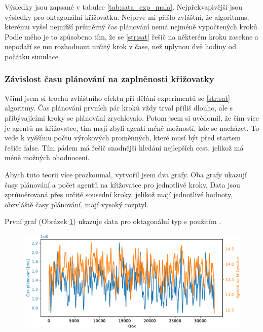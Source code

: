 
Výsledky jsou zapsané v tabulce \ref{tab:sata_exp_mala}.
Nejpřekvapivější jsou výsledky pro oktagonální křižovatku.
Nejprve mi přišlo zvláštní, že algoritmus, kterému vyšel nejnižší průměrný čas plánování nemá nejméně vypočtených kroků.
Podle mého je to způsobeno tím, že se \ref{str:sat} řešič na některém kroku zasekne a nepodaří se mu rozhodnout
určitý krok v čase, než uplynou dvě hodiny od počátku simulace.

\subsubsection{Závislost času plánování na zaplněnosti křižovatky}

Všiml jsem si trochu zvláštního efektu při dělání experimentů se \ref{str:sat} algoritmy.
Čas plánování prvních pár kroků vždy trval příliš dlouho, ale s přibývajícími kroky se plánování zrychlovalo.
Potom jsem si uvědomil, že čím více je agentů na křižovatce, tím mají zbylí agenti méně možností, kde se nacházet.
To vede k vyššímu počtu výrokových proměnných, které musí být před startem řešiče \textrm{false}.
Tím pádem má řešič snadnější hledání nejlepších cest, jelikož má méně možných ohodnocení.

Abych tuto teorii více prozkoumal, vytvořil jsem dva grafy.
Oba grafy ukazují časy plánování a počet agentů na křižovatce pro jednotlivé kroky.
Data jsou zprůměrovaná přes určité sousední kroky, jelikož mají jednotlivé hodnoty,
obzvláště časy plánování, mají vysoký rozptyl.

První graf (Obrázek \ref{fig:cas_vs_agenti_satrsg}) ukazuje data pro oktagonální typ s použitím .

\begin{figure}[h]
	\centering
	\includegraphics[width=140mm]{../img/CasVsAgentiSATRSG}
	\caption{}
	\label{fig:cas_vs_agenti_satrsg}
\end{figure}


